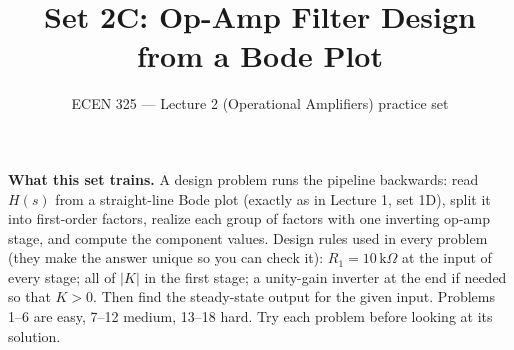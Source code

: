 \documentclass[11pt]{article}
\title{Set 2C: Op-Amp Filter Design from a Bode Plot}
\author{ECEN 325 --- Lecture 2 (Operational Amplifiers) practice set}
\date{}
\begin{document}
\maketitle

\textbf{What this set trains.} A design problem runs the pipeline backwards: read $H(s)$ from a straight-line Bode
plot (exactly as in Lecture 1, set 1D), split it into first-order factors, realize each group of factors with one
inverting op-amp stage, and compute the component values. Design rules used in every problem (they make the answer
unique so you can check it): $R_1=10\,\mathrm{k}\Omega$ at the input of every stage; all of $|K|$ in the first stage;
a unity-gain inverter at the end if needed so that $K>0$. Then find the steady-state output for the given input.
Problems 1--6 are easy, 7--12 medium, 13--18 hard. Try each problem before looking at its solution.
\end{document}
